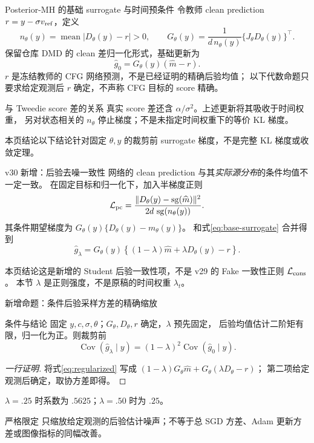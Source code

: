 \documentclass[10pt,aspectratio=169]{beamer}
\newcommand{\sg}{\operatorname{sg}}
\newcommand{\Cov}{\operatorname{Cov}}
\newcommand{\takeaway}[1]{\begin{exampleblock}{本页结论}\small #1\end{exampleblock}}
\begin{document}
\begin{frame}{Posterior-MH 的基础 surrogate 与时间预条件}
\small
令教师 clean prediction $r=y-\sigma v_{\rm ref}$，定义
\begin{equation}
n_\theta(y)=\operatorname{mean}|D_\theta(y)-r|>0,\qquad
G_\theta(y)=\frac{1}{d\,n_\theta(y)}\{J_\theta D_\theta(y)\}^\top.
\end{equation}
保留仓库 DMD 的 clean 差归一化形式，基础更新为
\begin{equation}\label{eq:base-surrogate}
\widehat g_0=G_\theta(y)(\widehat m-r).
\end{equation}
$r$ 是冻结教师的 CFG 网络预测，不是已经证明的精确后验均值；
以下代数命题只要求给定观测后 $r$ 确定，不声称 CFG 目标的 score 精确。
\begin{block}{与 Tweedie score 差的关系}
真实 score 差还含 $\alpha/\sigma^2$。上述更新将其吸收于时间权重，
另对状态相关的 $n_\theta$ 停止梯度；不是未指定时间权重下的等价 KL 梯度。
\end{block}
\takeaway{以下结论针对固定 $\theta,y$ 的裁剪前 surrogate 梯度，不是完整 KL 梯度或收敛定理。}
\end{frame}

\begin{frame}{v30 新增：后验去噪一致性}
\small
网络的 clean prediction 与其\emph{实际源分布}的条件均值不一定一致。
在固定目标和归一化下，加入半梯度正则
\begin{equation}\label{eq:consistency}
\mathcal L_{\rm pc}=\frac{\|D_\theta(y)-\sg(\widehat m)\|^2}
{2d\,\sg(n_\theta(y))}.
\end{equation}
其条件期望梯度为 $G_\theta(y)\{D_\theta(y)-m_\theta(y)\}$。
和式\eqref{eq:base-surrogate} 合并得到
\begin{equation}\label{eq:regularized}
\widehat g_\lambda
=G_\theta(y)\left\{(1-\lambda)\widehat m+\lambda D_\theta(y)-r\right\}.
\end{equation}
\takeaway{这是新增的 Student 后验一致性项，不是 v29 的 Fake 一致性正则 $\mathcal L_{\rm cons}$。
本节 $\lambda$ 是正则强度，不是原稿的时间权重 $\lambda_t$。}
\end{frame}

\begin{frame}{新增命题：条件后验采样方差的精确缩放}
\small
\begin{block}{条件与结论}
固定 $y,c,\sigma,\theta$；$G_\theta,D_\theta,r$ 确定，$\lambda$ 预先固定，
后验均值估计二阶矩有限，归一化为正。则裁剪前
\begin{equation}\label{eq:variance}
\Cov(\widehat g_\lambda\mid y)
=(1-\lambda)^2\Cov(\widehat g_0\mid y).
\end{equation}
\end{block}
\begin{proof}[一行证明]
将式\eqref{eq:regularized} 写成
$(1-\lambda)G_\theta\widehat m+G_\theta(\lambda D_\theta-r)$；
第二项给定观测后确定，取协方差即得。
\end{proof}
$\lambda=.25$ 时系数为 $.5625$；$\lambda=.50$ 时为 $.25$。
\begin{alertblock}{严格限定}
只缩放\alert{给定观测的后验估计噪声}；不等于总 SGD 方差、Adam 更新方差或图像指标的同幅改善。
\end{alertblock}
\end{frame}
\end{document}
